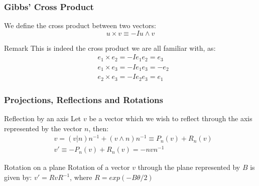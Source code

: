 \documentclass{beamer}
\begin{document}

\begin{frame}
\frametitle{Gibbs' Cross Product}
    \begin{definition}
        We define the cross product between two vectors:
        \[u \times v \equiv -Iu\wedge v\]
    \end{definition}
    \begin{block}{Remark}
        This is indeed the cross product we are all familiar with, as:
        \begin{align*}
            &e_1\times e_2 = -Ie_1e_2 = e_3 \\
            &e_1\times e_3 = -Ie_1e_3 = -e_2 \\
            &e_2\times e_3 = -Ie_2e_3 = e_1
        \end{align*}
    \end{block}
\end{frame}

\begin{frame}
\frametitle{Projections, Reflections and Rotations}
\begin{block}{Reflection by an axis}
    Let $v$ be a vector which we wish to reflect through the axis represented by the vector $n$, then:
    \begin{align*}
        &v = (v|n)n^{-1} + (v\wedge n)n^{-1} \equiv P_n(v) + R_n(v)\\
        &v' \equiv -P_n(v) + R_n(v) = -nvn^{-1}
    \end{align*}
\end{block}
\begin{block}{Rotation on a plane}
    Rotation of a vector $v$ through the plane represented by $B$ is given by: $v' = RvR^{-1}$, where $R = exp(-B\theta/2)$
\end{block}
\end{frame}
\end{document}
